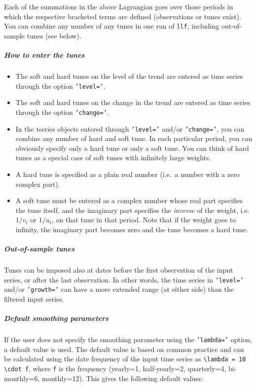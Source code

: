 Each of the summations in the above Lagrangian goes over those periods
in which the respective bracketed terms are defined (observations or
tunes exist). You can combine any number of any tunes in one run of
\texttt{llf}, including out-of-sample tunes (see below).

\subparagraph{How to enter the tunes}\label{how-to-enter-the-tunes}

\begin{itemize}
\item
  The soft and hard tunes on the level of the trend are entered as time
  series through the option \texttt{'level='}.
\item
  The soft and hard tunes on the change in the trend are entered as time
  series through the option \texttt{'change='}.
\item
  In the tseries objects entered through \texttt{'level='} and/or
  \texttt{'change='}, you can combine any number of hard and soft tune.
  In each particular period, you can obviously specify only a hard tune
  or only a soft tune. You can think of hard tunes as a special case of
  soft tunes with infinitely large weights.
\item
  A hard tune is specified as a plain real number (i.e.~a number with a
  zero complex part).
\item
  A soft tune must be entered as a complex number whose real part
  specifies the tune itself, and the imaginary part specifies the
  \emph{inverse} of the weight, i.e. $1/v_t$ or $1/u_t$, on that tune in
  that period. Note that if the weight goes to infinity, the imaginary
  part becomes zero and the tune becomes a hard tune.
\end{itemize}

\subparagraph{Out-of-sample tunes}\label{out-of-sample-tunes}

Tunes can be imposed also at dates before the first observation of the
input series, or after the last observation. In other words, the time
series in \texttt{'level='} and/or \texttt{'growth='} can have a more
extended range (at either side) than the filtered input series.

\subparagraph{Default smoothing
parameters}\label{default-smoothing-parameters}

If the user does not specify the smoothing parameter using the
\texttt{'lambda='} option, a default value is used. The default value is
based on common practice and can be calculated using the date frequency
of the input time series as
\texttt{\textbackslash{}lambda = 10 \textbackslash{}cdot f}, where
\texttt{f} is the frequency (yearly=1, half-yearly=2, quarterly=4,
bi-monthly=6, monthly=12). This gives the following default values:

